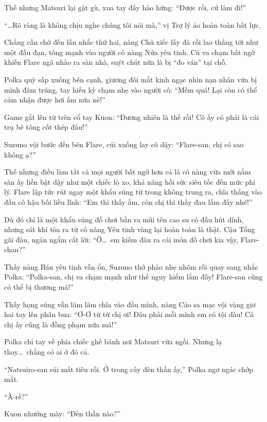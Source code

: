 \documentclass[../main.tex]{subfiles}
\begin{document}
Thế nhưng Matsuri lại gật gù, xua tay đầy hào hứng: ``Được rồi, cứ làm đi!''

``\dots Rõ ràng là không chịu nghe chúng tôi nói mà,'' vị Trợ lý ảo hoàn toàn bất lực.

Chẳng cần chờ đến lần nhắc thứ hai, nàng Chủ xiếc lấy đà rồi lao thẳng tới như một đầu đạn, tông mạnh vào người cô nàng Nửa yêu tinh. Cú va chạm bất ngờ khiến Flare ngã nhào ra sàn nhà, suýt chút nữa là bị ``đo ván'' tại chỗ.


Polka quỳ sấp xuống bên cạnh, giương đôi mắt kinh ngạc nhìn nạn nhân vừa bị mình đâm trúng, tay hiếu kỳ chạm nhẹ vào người cô: ``Mềm quá! Lại còn có thể cảm nhận được hơi ấm nữa nè!''

Game gắt lên từ trên cổ tay Kuon: ``Đương nhiên là thế rồi! Cô ấy có phải là cái trụ bê tông cốt thép đâu!''

Suzuno vội bước đến bên Flare, cúi xuống lay cô dậy: ``Flare-san, chị có sao không ạ?''

Thế nhưng điều làm tất cả mọi người bất ngờ hơn cả là cô nàng vừa mới nằm sàn ấy liền bật dậy như một chiếc lò xo, khả năng hồi sức siêu tốc đến mức phi lý. Flare lập tức rút ngay một khẩu súng từ trong không trung ra, chĩa thẳng vào đầu cô hậu bối liều lĩnh: ``Em thì thấy ấm, còn chị thì thấy đau lắm đấy nhé!''

Dù đó chỉ là một khẩu súng đồ chơi bắn ra mũi tên cao su có đầu hút dính, nhưng sát khí tỏa ra từ cô nàng Yêu tinh vàng lại hoàn toàn là thật. Cậu Tổng gãi đàu, ngán ngẩm cất lời: ``Ờ\dots\ em kiếm đâu ra cái món đồ chơi kia vậy, Flare-chan?''


Thấy nàng Bán yêu tinh vẫn ổn, Suzuno thở phào nhẹ nhõm rồi quay sang nhắc Polka: ``Polka-san, chị va chạm mạnh như thế nguy hiểm lắm đấy! Flare-san cũng có thể bị thương mà!''

Thấy họng súng vẫn lăm lăm chĩa vào đầu mình, nàng Cáo sa mạc vội vàng giơ hai tay lên phân bua: ``Ơ-Ơ từ từ chị ơi! Đâu phải mỗi mình em có tội đâu! Cả chị ấy cũng là đồng phạm nữa mà!''

Polka chỉ tay về phía chiếc ghế bành nơi Matsuri vừa ngồi. Nhưng lạ thay\dots\ chẳng có ai ở đó cả.

``Natsuiro-san sủi mất tiêu rồi. Ở trong cây đèn thần ấy,'' Polka ngơ ngác chớp mắt.

``À-rế?''

Kuon nhướng mày: ``Đèn thần nào?''
\end{document}
